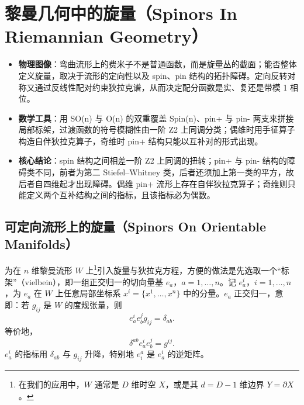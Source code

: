 
\appendix
\section{黎曼几何中的旋量（Spinors In Riemannian Geometry）}\label{dirram}

\begin{keytakeaways}
\begin{itemize}[leftmargin=1.6em,itemsep=0.2em,topsep=0.2em]
  \item \textbf{物理图像}：弯曲流形上的费米子不是普通函数，而是旋量丛的截面；能否整体定义旋量，取决于流形的定向性以及 spin、pin 结构的拓扑障碍。定向反转对称又通过反线性配对约束狄拉克谱，从而决定配分函数是实、复还是带模 1 相位。
  \item \textbf{数学工具}：用 SO(n) 与 O(n) 的双重覆盖 Spin(n)、pin+ 与 pin- 两支来拼接局部标架，过渡函数的符号模糊性由一阶 Z2 上同调分类；偶维时用手征算子构造自伴狄拉克算子，奇维时 pin+ 结构只能以互补对的形式出现。
  \item \textbf{核心结论}：spin 结构之间相差一阶 Z2 上同调的扭转；pin+ 与 pin- 结构的障碍类不同，前者为第二 Stiefel--Whitney 类，后者还须加上第一类的平方，故后者自四维起才出现障碍。偶维 pin+ 流形上存在自伴狄拉克算子；奇维则只能定义两个互补结构之间的指标，且该指标必为偶数。
\end{itemize}
\end{keytakeaways}

\subsection{可定向流形上的旋量（Spinors On Orientable Manifolds）}\label{spinor}

为在 $n$ 维黎曼流形 $W$ 上\footnote{在我们的应用中，$W$ 通常是 $D$ 维时空 $X$，或是其 $d=D-1$ 维边界 $Y=\partial X$。}引入旋量与狄拉克方程，方便的做法是先选取一个“标架”（vielbein），即一组正交归一的切向量基 $e_a$，$a=1,\dots,n$。记 $e_a^i$，$i=1,\dots,n$，为 $e_a$ 在 $W$ 上任意局部坐标系 $x^i=\{x^1,\dots,x^n\}$ 中的分量。$e_a$ 正交归一，意即：若 $g_{i j}$ 是 $W$ 的度规张量，则
\begin{equation}\label{orth} e_a^i e_b^jg_{ij}=\delta_{ab}.\end{equation}
等价地，
\begin{equation}\label{north} \delta^{ab}e_a^ie_b^j =g^{ij}. \end{equation}
$e_a^i$ 的指标用 $\delta_{ab}$ 与 $g_{ij}$ 升降，特别地 $e_i^a$ 是 $e_a^i$ 的逆矩阵。

